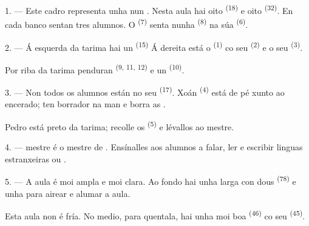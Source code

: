 \VUsaut{2.0mm}
\VUsaut{3.2mm}
\VUsaut{2.6mm}
\VUsaut{3.4mm}
\VUornamento{9pt}
\VUsaut{5.0mm}
\VUsaut{3.0mm}
\VUfilet{16mm}
\VUsaut{5.6mm}

\VUsaut{1.4mm}
\VUsaut{2.2mm}
\VUfilet{20mm}
\VUsaut{6.4mm}

\VUsaut{3.0mm}

1. --- Este cadro representa unha  nun . Nesta aula
hai oito  \textsuperscript{(18)} e oito 
\textsuperscript{(32)}. En cada banco sentan tres alumnos. O 
\textsuperscript{(7)} senta nunha  \textsuperscript{(8)} na súa
 \textsuperscript{(6)}.

2. --- Á esquerda da tarima hai un  \textsuperscript{(15)}
 Á dereita está o  \textsuperscript{(1)} co seu
 \textsuperscript{(2)} e o seu  \textsuperscript{(3)}.

Por riba da tarima penduran  \textsuperscript{(9, 11, 12)} e un
 \textsuperscript{(10)}.

3. --- Non todos os alumnos están no seu  \textsuperscript{(17)}. Xoán
\textsuperscript{(4)} está de pé xunto ao encerado; ten  borrador na man e
borra as .

Pedro está preto da tarima; recolle os 
\textsuperscript{(5)} e lévallos ao mestre.

4. ---  mestre é o mestre de . Ensínalles aos
alumnos a falar, ler e escribir linguas estranxeiras  ou .

5. --- A aula é moi ampla e moi clara. Ao fondo hai unha  larga con
dous  \textsuperscript{(78)} e unha  para
airear e alumar a aula.

Esta aula non é fría. No medio, para quentala, hai unha  moi boa
\textsuperscript{(46)} co seu  \textsuperscript{(45)}.

